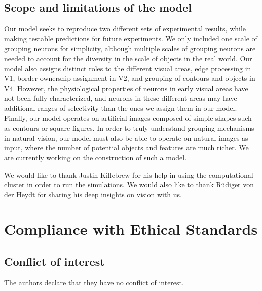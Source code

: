 \subsection{Scope and limitations of the model}
Our model seeks to reproduce two different sets of experimental
results, while making testable predictions for future experiments. 
We only included one scale of grouping neurons for
simplicity, although 
multiple scales of grouping
neurons are needed to account for the diversity in the scale of
objects in the real world.
Our model also assigns distinct roles to the
different visual areas,  edge processing in V1, border ownership
assignment in V2, and grouping of contours and objects in V4. However,
the physiological properties of neurons in early visual areas have not
been fully characterized, and 
neurons in these different
areas may have 
additional ranges of selectivity
than the ones we assign them in our model. 
Finally, our model operates on artificial
images composed of simple shapes such as contours or square
figures. In order to truly understand grouping mechanisms in natural
vision, our model must also be able to operate on natural images as
input, where the number of potential objects and features are much
richer. We are currently working  
on the construction of such a model.

\begin{acknowledgements}
We would like to thank Justin Killebrew for his help
in using the computational cluster in order to run the simulations. We would also
like to thank R\"udiger von der Heydt for sharing his deep insights on
vision with us. 
\end{acknowledgements}

\section*{Compliance with Ethical Standards}
\subsection*{Conflict of interest}
The authors declare that they have no conflict of
interest.



